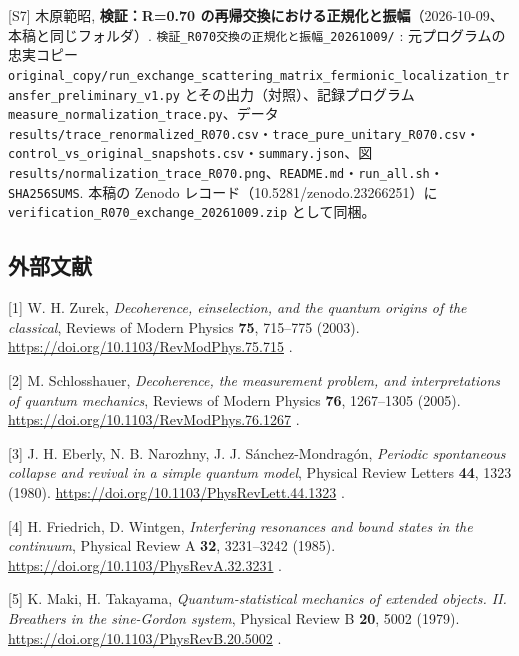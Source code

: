 \documentclass[
  a4paper,
]{ltjsarticle}
\begin{document}
{[}S7{]} 木原範昭, \textbf{検証：R=0.70
の再帰交換における正規化と振幅}（2026-10-09、本稿と同じフォルダ）.
\texttt{検証\_\allowbreak{}R070交換の正規化と振幅\_\allowbreak{}20261009/\allowbreak{}} :
元プログラムの忠実コピー
\texttt{original\_\allowbreak{}copy/\allowbreak{}run\_\allowbreak{}exchange\_\allowbreak{}scattering\_\allowbreak{}matrix\_\allowbreak{}fermionic\_\allowbreak{}localization\_\allowbreak{}transfer\_\allowbreak{}preliminary\_\allowbreak{}v1.py}
とその出力（対照）、記録プログラム
\texttt{measure\_\allowbreak{}normalization\_\allowbreak{}trace.py}、データ
\texttt{results/\allowbreak{}trace\_\allowbreak{}renormalized\_\allowbreak{}R070.csv}・\texttt{trace\_\allowbreak{}pure\_\allowbreak{}unitary\_\allowbreak{}R070.csv}・\texttt{control\_\allowbreak{}vs\_\allowbreak{}original\_\allowbreak{}snapshots.csv}・\texttt{summary.json}、図
\texttt{results/\allowbreak{}normalization\_\allowbreak{}trace\_\allowbreak{}R070.png}、\texttt{README.md}・\texttt{run\_\allowbreak{}all.sh}・\texttt{SHA256SUMS}.
本稿の Zenodo レコード（10.5281/zenodo.23266251）に
\texttt{verification\_\allowbreak{}R070\_\allowbreak{}exchange\_\allowbreak{}20261009.zip} として同梱。

\subsection{外部文献}\label{ux5916ux90e8ux6587ux732e}

{[}1{]} W. H. Zurek, \emph{Decoherence, einselection, and the quantum
origins of the classical}, Reviews of Modern Physics \textbf{75},
715--775 (2003). \url{https://doi.org/10.1103/RevModPhys.75.715} .

{[}2{]} M. Schlosshauer, \emph{Decoherence, the measurement problem, and
interpretations of quantum mechanics}, Reviews of Modern Physics
\textbf{76}, 1267--1305 (2005).
\url{https://doi.org/10.1103/RevModPhys.76.1267} .

{[}3{]} J. H. Eberly, N. B. Narozhny, J. J. Sánchez-Mondragón,
\emph{Periodic spontaneous collapse and revival in a simple quantum
model}, Physical Review Letters \textbf{44}, 1323 (1980).
\url{https://doi.org/10.1103/PhysRevLett.44.1323} .

{[}4{]} H. Friedrich, D. Wintgen, \emph{Interfering resonances and bound
states in the continuum}, Physical Review A \textbf{32}, 3231--3242
(1985). \url{https://doi.org/10.1103/PhysRevA.32.3231} .

{[}5{]} K. Maki, H. Takayama, \emph{Quantum-statistical mechanics of
extended objects. II. Breathers in the sine-Gordon system}, Physical
Review B \textbf{20}, 5002 (1979).
\url{https://doi.org/10.1103/PhysRevB.20.5002} .
\end{document}
